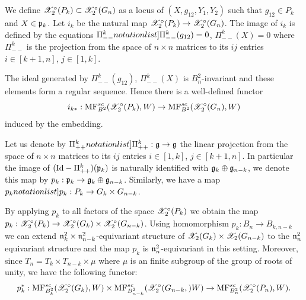 We define $\mathscr{X}^\circ_2(P_k)\subset\mathscr{X}^\circ_2(G_n)$ as a locus of $(X,g_{12},Y_1,Y_2)$ such that $g_{12}\in P_k$ and $X\in \mathfrak{p}_k$.
Let $i_k$ be the natural  map $\mathscr{X}^\circ_2(P_k)\to \mathscr{X}_2^\circ(G_n)$. The image of $i_k$ is defined by the equations
$\SymbolPrint{\Pi_{--}^k}(g_{12})=0$, $\Pi_{--}^k(X)=0$  where $\Pi^k_{--}$ is the projection from the space of $n\times n$ matrices to its $ij$ entries $i\in [k+1,n]$, $j\in [1,k]$.

The ideal generated by $\Pi_{--}^k(g_{12})$, $\Pi_{--}^k(X)$  is $B_n^2$-invariant and these elements form a regular sequence. Hence there is a well-defined functor
$$ i_{k*}:\mathrm{MF}^{sc}_{B^2}(\mathscr{X}^\circ_2(P_k),W)\to \mathrm{MF}^{sc}_{B^2}(\mathscr{X}_2^\circ(G_n),W)$$
induced by the embedding.

Let us denote by $\SymbolPrint{\Pi_{++}^k}:\frg\to \frg$ the linear projection from the space of $n\times n$ matrices to its  $ij$ entries $i\in [1,k]$, $j\in [k+1,n]$. In particular
the image of $(\mathrm{Id}-\Pi_{++}^k)(\mathfrak{p}_k)$ is naturally identified with $\mathfrak{g}_k\oplus\mathfrak{g}_{n-k}$, we denote this map by $p_k:\mathfrak{p}_k\to \mathfrak{g}_k\oplus \mathfrak{g}_{n-k}$.
Similarly, we have a map $\SymbolPrint{p_k}:P_k\to G_k\times G_{n-k}$.

By applying $p_k$ to all factors of the space $\mathscr{X}_2^\circ(P_k)$ we obtain the map
$p_k:\mathscr{X}^\circ_2(P_k)\to \mathscr{X}^\circ_2(G_k)\times\mathscr{X}^\circ_2(G_{n-k})$.
Using homomorphism $p_k\colon B_n\to B_{k,n-k}$ we can extend $\mathfrak{n}_k^2\times \mathfrak{n}_{n-k}^2$-equivariant structure of $\mathscr{X}_2(G_k)\times \mathscr{X}_2(G_{n-k})$ to the
$\mathfrak{n}_n^2$ equivariant structure and the map $p_k$ is $\mathfrak{n}_n^2$-equivariant in this setting.
Moreover, since $T_n=T_k\times T_{n-k}\times \mu$ where $\mu$ is an finite subgroup of the group of roots of unity, we have the following functor:
$$ p_k^*: \mathrm{MF}^{sc}_{B_k^2}(\mathscr{X}^\circ_2(G_k),W)\times \mathrm{MF}^{sc}_{B_{n-k}^2}(\mathscr{X}^\circ_2(G_{n-k},)W)\to \mathrm{MF}^{sc}_{B_n^2}(\mathscr{X}^\circ_2(P_n),W).$$


